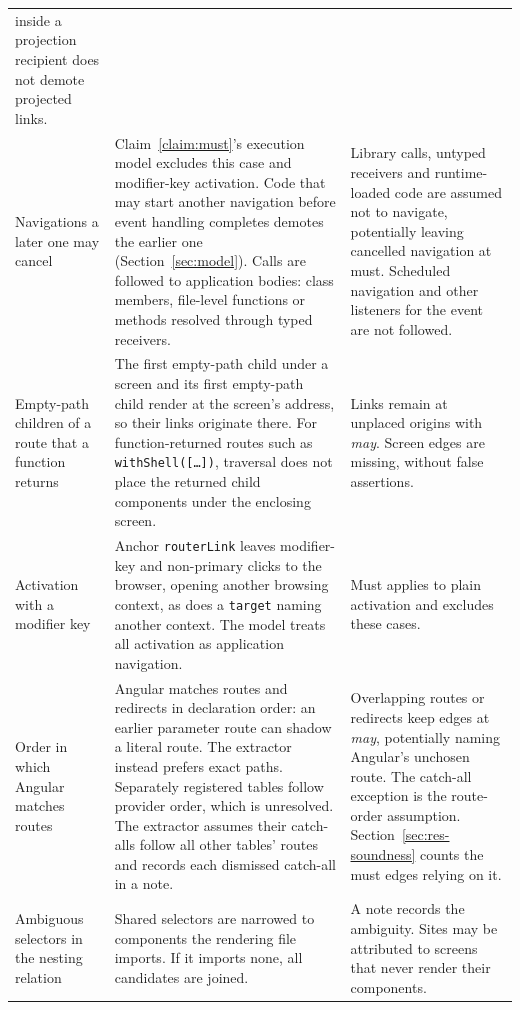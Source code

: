 \begin{xltabular}{\textwidth}{@{}>{\raggedright\arraybackslash}p{2.7cm}YY@{}}
inside a projection recipient does not demote projected links. \\
Navigations a later one may cancel
& Claim~\ref{claim:must}'s execution model excludes this case and modifier-key activation.
Code that may start another navigation before event handling completes demotes the earlier one
(Section~\ref{sec:model}). Calls are followed to application bodies: class members, file-level
functions or methods resolved through typed receivers.
& Library calls, untyped receivers and runtime-loaded code are assumed not to navigate, potentially
leaving cancelled navigation at must. Scheduled navigation and other listeners for the event are not followed. \\
Empty-path children of a route that a function returns
& The first empty-path child under a screen and its first empty-path child render at the screen's
address, so their links originate there. For function-returned routes such as
\texttt{withShell([\ldots])}, traversal does not place the returned child components under the enclosing screen.
& Links remain at unplaced origins with \emph{may}. Screen edges are missing, without false assertions. \\
Activation with a modifier key
& Anchor \texttt{routerLink} leaves modifier-key and non-primary clicks to the browser, opening
another browsing context, as does a \texttt{target} naming another context. The model treats all
activation as application navigation.
& Must applies to plain activation and excludes these cases. \\
Order in which Angular matches routes
& Angular matches routes and redirects in declaration order: an earlier parameter route can shadow
a literal route. The extractor instead prefers exact paths. Separately registered tables follow
provider order, which is unresolved. The extractor assumes their catch-alls follow all other tables'
routes and records each dismissed catch-all in a note.
& Overlapping routes or redirects keep edges at \emph{may}, potentially naming Angular's unchosen route.
The catch-all exception is the route-order assumption. Section~\ref{sec:res-soundness} counts the
must edges relying on it. \\
Ambiguous selectors in the nesting relation
& Shared selectors are narrowed to components the rendering file imports. If it imports none, all
candidates are joined.
& A note records the ambiguity. Sites may be attributed to screens that never render their components. \\
\end{xltabular}
\par{}
\endgroup

